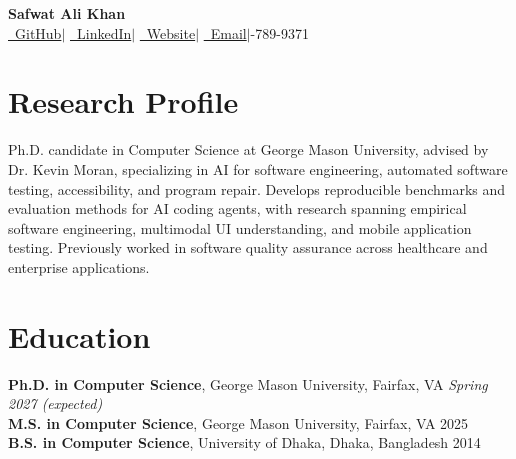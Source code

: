 \documentclass[a4paper,10pt]{article}
\begin{document}
\pagestyle{empty}
\begin{center}
{\LARGE\bfseries Safwat Ali Khan}\\[4pt]
\href{https://github.com/safwatalikhan}{\faGithub\ GitHub}\quad$|$\quad
\href{https://linkedin.com/in/safwatalikhan/}{\faLinkedin\ LinkedIn}\quad$|$\quad
\href{https://safwatalikhan.com}{\faGlobe\ Website}\quad$|$\quad
\href{mailto:safwatalikhan@gmail.com}{\faEnvelope\ Email}\quad$|$-789-9371
\end{center}
\vspace{-9pt}
\section{Research Profile}
Ph.D. candidate in Computer Science at George Mason University, advised by Dr. Kevin Moran, specializing in AI for software engineering, automated software testing, accessibility, and program repair. Develops reproducible benchmarks and evaluation methods for AI coding agents, with research spanning empirical software engineering, multimodal UI understanding, and mobile application testing. Previously worked in software quality assurance across healthcare and enterprise applications.

\section{Education}
\textbf{Ph.D. in Computer Science}, George Mason University, Fairfax, VA \hfill \textit{Spring 2027 (expected)}\\
\textbf{M.S. in Computer Science}, George Mason University, Fairfax, VA \hfill 2025\\
\textbf{B.S. in Computer Science}, University of Dhaka, Dhaka, Bangladesh \hfill 2014
\end{document}
